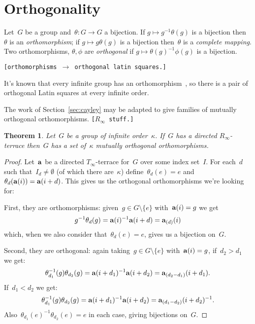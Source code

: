 \documentclass[12pt,a4paper]{article}
\newtheorem{thm}{Theorem}[section]
\begin{document}
\section{Orthogonality}\label{sec:orth}

Let~$G$ be a group and~$\theta: G \rightarrow G$ a bijection.  If $g \mapsto g^{-1}\theta(g)$ is a bijection then~$\theta$ is an {\em orthomorphism}; if  $g \mapsto g\theta(g)$ is a bijection then~$\theta$ is a {\em complete mapping}.  Two orthomorphisms, $\theta, \phi$ are {\em orthogonal} if $g \mapsto \theta(g)^{-1} \phi(g)$ is a bijection.

\texttt{[orthomorphisms $\rightarrow$ orthogonal latin squares.]}

It's known that every infinite group has an orthomorphism~\cite{Bateman50}, so there is a pair of orthogonal Latin squares at every infinite order.


The work of Section~\ref{sec:cayley} may be adapted to give families of mutually orthogonal orthomorphisms. \texttt{[$R_{\infty}$ stuff.]}



\begin{thm}
Let~$G$ be a group of infinite order~$\kappa$.  If~$G$ has a directed $R_{\infty}$-terrace then~$G$ has a set of~$ \kappa$ mutually orthogonal orthomorphisms. 
\end{thm}

\begin{proof}
Let~${\bf a}$ be a directed $T_{\infty}$-terrace for~$G$ over some index set~$I$.  For each~$d$ such that~$I_d \neq \emptyset$ (of which there are~$\kappa$) define~$\theta_d(e) = e$ and $\theta_d( {\bf a}(i) ) = {\bf a}(i+d)$.  This gives us the orthogonal orthomorphisms we're looking for:

First, they are orthomorphisms: given~$g \in G \setminus \{ e \}$ with~${\bf a}(i) = g$ we get
$$g^{-1}\theta_d(g) = {\bf a}(i)^{-1}{\bf a}(i+d) = {\bf a}_{(d)}(i)$$
which, when we also consider that~$\theta_d(e)=e$, gives us a bijection on~$G$.

Second, they are orthogonal: again taking~$g \in G \setminus \{ e \}$ with~${\bf a}(i) = g$, if~$d_2 > d_1$ we get: 
$$\theta_{d_1}^{-1}(g) \theta_{d_2}(g) =  {\bf a}(i+d_1)^{-1}{\bf a}(i+d_2)  = {\bf a}_{(d_2 - d_1)}(i+d_1) .       $$
If~$d_1 < d_2$ we get:
$$\theta_{d_1}^{-1}(g) \theta_{d_2}(g) =  {\bf a}(i+d_1)^{-1}{\bf a}(i+d_2)  = {\bf a}_{(d_1 - d_2)}(i+d_2)^{-1} .       $$
Also~$\theta_{d_1}(e)^{-1}\theta_{d_2}(e) =e$ in each case, giving bijections on~$G$.
\end{proof}
\end{document}
